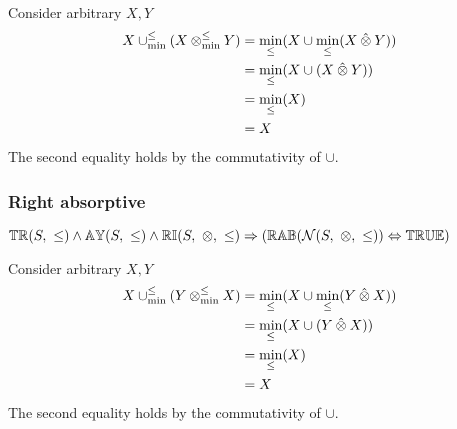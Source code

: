 \documentclass[../Summary.tex]{subfiles}
\begin{document}
Consider arbitrary $X, Y$
\begin{align*}
X \mathbin{\cup_{\min}^{\leq}} (X \mathbin{\otimes_{\min}^{\leq}} Y) 	& = \min_\leq(X \cup \min_\leq(X \mathbin{\hat{\otimes}} Y)) \\
							& = \min_\leq(X \cup (X \mathbin{\hat{\otimes}} Y)) \\
							& = \min_\leq(X) \\
							& = X
\end{align*}
The second equality holds by the commutativity of $\cup$.



\subsubsection{Right absorptive}

${\mathbb{TR}}(S,\ \leq) \wedge {\mathbb{AY}}(S,\ \leq) \wedge {\mathbb{RI}}(S,\ \otimes,\ \leq) \Rightarrow ({\mathbb{RAB}}(\mathcal{N}(S,\ \otimes,\ \leq)) \Leftrightarrow {\mathbb{TRUE}})$

\proof

Consider arbitrary $X, Y$
\begin{align*}
X \mathbin{\cup_{\min}^{\leq}} (Y \mathbin{\otimes_{\min}^{\leq}} X) 	& = \min_\leq(X \cup \min_\leq(Y \mathbin{\hat{\otimes}} X)) \\
							& = \min_\leq(X \cup (Y \mathbin{\hat{\otimes}} X)) \\
							& = \min_\leq(X) \\
							& = X	
\end{align*}
The second equality holds by the commutativity of $\cup$.
\end{document}
